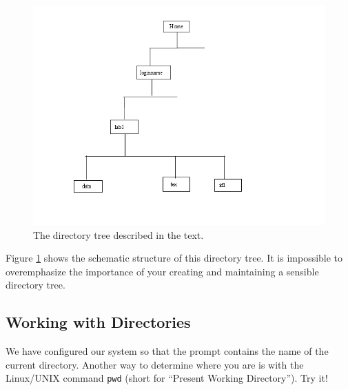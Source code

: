 \documentclass[]{article}
\begin{document}
\begin{figure}[h!]
\begin{center}
\includegraphics[scale=0.4]{dirtree.png}
\end{center}
\caption{The directory tree described in the text. 
\label{dirtree}}
\end{figure}

Figure \ref{dirtree} shows the schematic structure of this directory
tree. It is impossible to overemphasize the importance of your creating
and maintaining a sensible directory tree.

\subsection{Working with Directories}

We have configured our system so that the prompt contains the name of
the current directory. Another way to determine where you are is with
the Linux/UNIX command {\tt pwd} (short for ``Present Working
Directory''). Try it!
\end{document}
